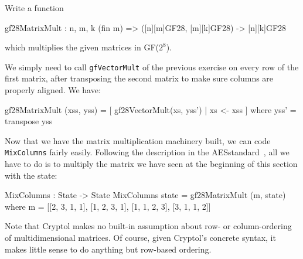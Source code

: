 \begin{Exercise}\label{ex:aesmc:3}
Write a function
\begin{code}
  gf28MatrixMult : {n, m, k} (fin m) => ([n][m]GF28, [m][k]GF28) 
                                      -> [n][k]GF28
\end{code}
which multiplies the given matrices in GF($2^8$)\indGF.
\end{Exercise}
\begin{Answer}
  We simply need to call {\tt gfVectorMult} of the previous exercise
  on every row of the first matrix, after transposing the second
  matrix to make sure columns are properly aligned. We
  have:\indTranspose
\begin{code}
  gf28MatrixMult (xss, yss) = [ gf28VectorMult(xs, yss')
                              | xs <- xss ]
       where yss' = transpose yss
\end{code}
\end{Answer}


\unparagraph Now that we have the matrix multiplication machinery
built, we can code {\tt MixColumns} fairly easily. Following the
description in the AES\indAES standard~\cite[section 5.3.1]{aes}, all
we have to do is to multiply the matrix we have seen at the beginning
of this section with the state:

\begin{code}
  MixColumns : State -> State
  MixColumns state = gf28MatrixMult (m, state)
    where m = [[2, 3, 1, 1],
               [1, 2, 3, 1],
               [1, 1, 2, 3],
               [3, 1, 1, 2]]
\end{code}

Note that Cryptol makes no built-in assumption about row- or
column-ordering of multidimensional matrices.  Of course, given
Cryptol's concrete syntax, it makes little sense to do anything but
row-based ordering.



